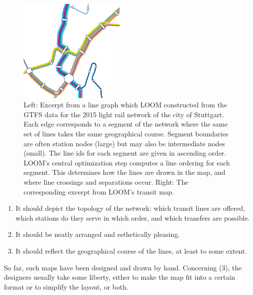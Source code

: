 \documentclass[sigconf]{acmart}
\begin{document}
\begin{figure}[t]
  \centering
  
  \hspace{0.5cm}
  \includegraphics[trim={0cm 0 2.47cm 4.07cm},clip,width=0.46\textwidth]{render_examples/vvs_cropped.pdf}
  \caption{Left: Excerpt from a line graph which LOOM constructed from the GTFS data for the 2015 light rail network of the city of Stuttgart. Each edge corresponds to a segment of the network where the same set of lines takes the same geographical course. Segment boundaries are often station nodes (large) but may also be intermediate nodes (small). The line ids for each segment are given in ascending order. LOOM's central optimization step computes a line ordering for each segment. This determines how the lines are drawn in the map, and where line crossings and separations occur. Right: The corresponding excerpt from LOOM's transit map.}
  \label{FIG:transitgraphvvs}  
\end{figure}


\begin{enumerate}[parsep=0.5mm, wide, labelwidth=0mm, itemindent=2.3mm]
  \setlength\itemsep{0pt}
\item  It should depict the topology of the network: which transit lines are offered, which stations do they serve in which order, and which transfers are possible.
\item It should be neatly arranged and esthetically pleasing.
\item It should reflect the geographical course of the lines, at least to some extent.
\end{enumerate}

\smallskip\noindent
So far, such maps have been designed and drawn by hand.
Concerning (3), the designers usually take some liberty, either to make the map fit into a certain format or to simplify the layout, or both.
\end{document}
